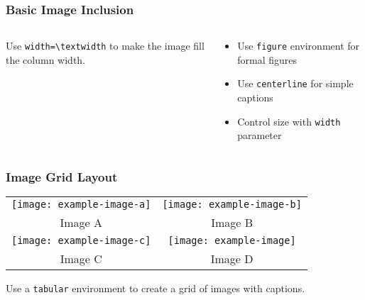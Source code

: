 \documentclass[aspectratio=169,professionalfonts]{beamer}
\begin{document}
\begin{frame}
    \frametitle{Basic Image Inclusion}
    
    \begin{columns}[T]
        \begin{column}{0.48\textwidth}   
            \begin{tcolorbox}[colback=ugmLightGrey,colframe=ugmBlue,title=Image Tip]
                Use \texttt{width=\textbackslash textwidth} to make the image fill the column width.
            \end{tcolorbox}
        \end{column}
        
        \begin{column}{0.48\textwidth}
            \begin{itemize}
                \item Use \texttt{figure} environment for formal figures
                \item Use \texttt{centerline} for simple captions
                \item Control size with \texttt{width} parameter
            \end{itemize}
        \end{column}
    \end{columns}
\end{frame}

\begin{frame}
    \frametitle{Image Grid Layout}
    
    \begin{center}
        \begin{tabular}{cc}
            \texttt{[image: example-image-a]} &
            \texttt{[image: example-image-b]} \\
            \small Image A & \small Image B \\[1em]
            \texttt{[image: example-image-c]} &
            \texttt{[image: example-image]} \\
            \small Image C & \small Image D \\
        \end{tabular}
    \end{center}
    
    \begin{tcolorbox}[colback=ugmLightGrey,colframe=ugmBlue,title=Grid Tip]
        Use a \texttt{tabular} environment to create a grid of images with captions.
    \end{tcolorbox}
\end{frame}
\end{document}
